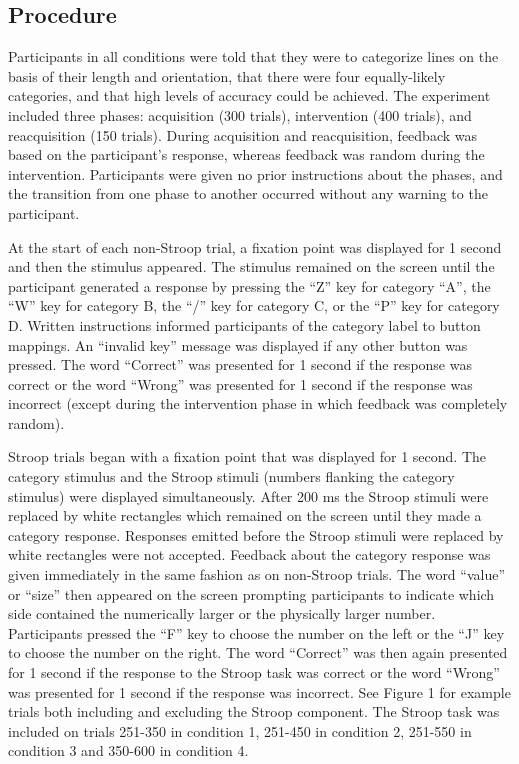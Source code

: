 \documentclass[apacite,draftfirst,man]{apa6}
\begin{document}
\subsection{Procedure} Participants in all conditions were told that they were
to categorize lines on the basis of their length and orientation, that there
were four equally-likely categories, and that high levels of accuracy could be
achieved. The experiment included three phases: acquisition (300 trials),
intervention (400 trials), and reacquisition (150 trials). During acquisition
and reacquisition, feedback was based on the participant's response, whereas
feedback was random during the intervention. Participants were given no prior
instructions about the phases, and the transition from one phase to another
occurred without any warning to the participant.

At the start of each non-Stroop trial, a fixation point was displayed for 1
second and then the stimulus appeared. The stimulus remained on the screen until
the participant generated a response by pressing the ``Z'' key for category
``A'', the ``W'' key for category B, the ``/'' key for category C, or the ``P''
key for category D. Written instructions informed participants of the category
label to button mappings. An ``invalid key'' message was displayed if any other
button was pressed. The word ``Correct'' was presented for 1 second if the
response was correct or the word ``Wrong'' was presented for 1 second if the
response was incorrect (except during the intervention phase in which feedback
was completely random).

Stroop trials began with a fixation point that was displayed for 1 second. The
category stimulus and the Stroop stimuli (numbers flanking the category
stimulus) were displayed simultaneously. After 200 ms the Stroop stimuli were
replaced by white rectangles which remained on the screen until they made a
category response. Responses emitted before the Stroop stimuli were replaced by
white rectangles were not accepted. Feedback about the category response was
given immediately in the same fashion as on non-Stroop trials. The word
``value'' or ``size'' then appeared on the screen prompting participants to
indicate which side contained the numerically larger or the physically larger
number. Participants pressed the ``F'' key to choose the number on the left or
the ``J'' key to choose the number on the right. The word ``Correct'' was then
again presented for 1 second if the response to the Stroop task was correct or
the word ``Wrong'' was presented for 1 second if the response was incorrect. See
Figure 1 for example trials both including and excluding the Stroop component.
The Stroop task was included on trials 251-350 in condition 1, 251-450 in
condition 2, 251-550 in condition 3 and 350-600 in condition 4.
\end{document}
